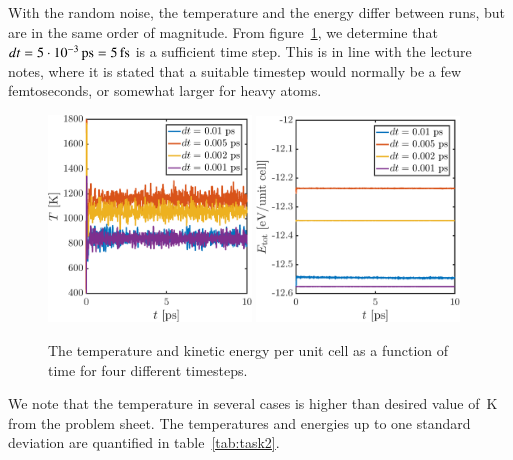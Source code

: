 With the random noise, the temperature and the energy differ between runs, but are in the same order of magnitude. From figure~\ref{fig:task2}, we determine that $dt = \unit[5 \cdot 10^{-3}]{ps} = \unit[5]{fs}$ is a sufficient time step. This is in line with the lecture notes, where it is stated that a suitable timestep would normally be a few femtoseconds, or somewhat larger for heavy atoms.
\begin{figure}[!ht]
\begin{center}
  \includegraphics[width=0.48\textwidth]{../figures/dt-scan-temperature} 
    \includegraphics[width=0.48\textwidth]{../figures/dt-scan-energy} 
  \caption{The temperature and kinetic energy per unit cell as a function of time for four different timesteps.}
  \label{fig:task2}
\end{center}
\end{figure}  
We note that the temperature in several cases is higher than desired value of~\unit[600-800]{K} from the problem sheet. The temperatures and energies up to one standard deviation are quantified in table~\ref{tab:task2}. 
